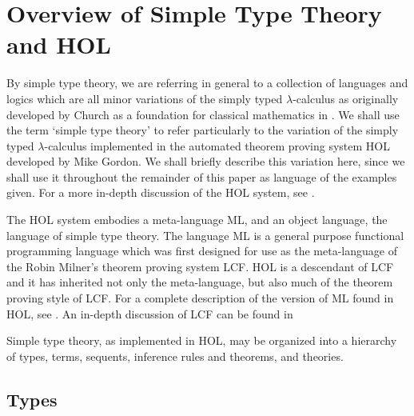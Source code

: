 \section{Overview of Simple Type Theory and HOL}

By simple type theory, we are referring in general to a collection of
languages and logics which are all minor variations of the simply
typed $\lambda$-calculus as originally developed by Church as a
foundation for classical mathematics in \cite{Church40}.  We shall use
the term `simple type theory' to refer particularly to the variation
of the simply typed $\lambda$-calculus implemented in the automated
theorem proving system HOL developed by Mike Gordon.  We shall briefly
describe this variation here, since we shall use it throughout the
remainder of this paper as language of the examples given.  For a more
in-depth discussion of the HOL system, see \cite{Gordon87}.

The HOL system embodies a meta-language ML, and an object language,
the language of simple type theory.  The language ML is a general
purpose functional programming language which was first designed for
use as the meta-language of the Robin Milner's theorem proving system
LCF.  HOL is a descendant of LCF and it has inherited not only the
meta-language, but also much of the theorem proving style of LCF.  For
a complete description of the version of ML found in HOL, see \cite{ML}.
An in-depth discussion of LCF can be found in \cite{Paulson87}

Simple type theory, as implemented in HOL, may be organized into a
hierarchy of types, terms, sequents, inference rules and theorems, and
theories.


\subsection{Types}

